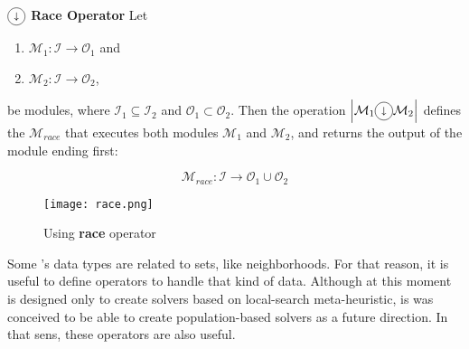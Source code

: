 \begin{definition}\label{op:race}
$\circled{$\shortdownarrow$}$ {\bf Race Operator} Let 
\begin{enumerate}%
	\item $\mathcal{M}_1 : \mathcal{I} \rightarrow \mathcal{O}_1$ and  
	\item $\mathcal{M}_2 : \mathcal{I} \rightarrow \mathcal{O}_2$,
\end{enumerate}%
be modules, where $\mathcal{I}_1 \subseteq \mathcal{I}_2$ and $\mathcal{O}_1 \subset \mathcal{O}_2$. Then the operation $\left|\mathcal{M}_1\circled{$\shortdownarrow$}\mathcal{M}_2\right|$ defines the \cm{} $\mathcal{M}_{race}$ that executes both modules $\mathcal{M}_1$ and $\mathcal{M}_2$, and returns the output of the module ending first:

\[
\mathcal{M}_{race}:\mathcal{I} \rightarrow \mathcal{O}_1 \cup \mathcal{O}_2 
\]
\end{definition}


\begin{figure}[h]
	\centering	
	\texttt{[image: race.png]}
	\caption{Using {\bf race} operator}\label{fig:race_example}
\end{figure}

\separation

Some \posl's data types are related to sets, like neighborhoods. For that reason, it is useful to define operators to handle that kind of data. Although at this moment \posl{} is designed only to create solvers based on local-search meta-heuristic, is was conceived to be able to create population-based solvers as a future direction. In that sens, these operators are also useful.

